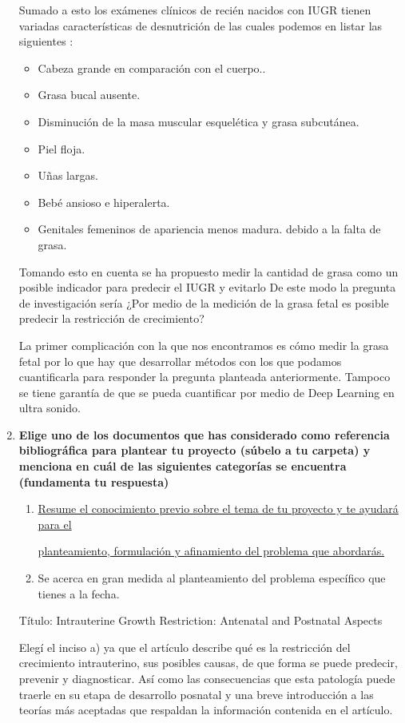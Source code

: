 \begin{enumerate}
	Sumado a esto los exámenes clínicos de recién nacidos con
	IUGR tienen variadas características de desnutrición de las
	cuales podemos en listar las siguientes
	\citep{sharma2016intrauterine}:
	\begin{itemize}
		\item Cabeza grande en comparación con el cuerpo..
		\item Grasa bucal ausente.
		\item Disminución de la masa muscular esquelética y grasa
		subcutánea.
		\item Piel floja.
		\item Uñas largas.
		\item Bebé ansioso e hiperalerta.
		\item Genitales femeninos de apariencia menos madura.
		debido a la falta de grasa.
	\end{itemize}
	
	Tomando esto en cuenta se ha propuesto medir la cantidad de
	grasa como un posible indicador para predecir el IUGR y 
	evitarlo De este modo la pregunta de investigación sería 
	¿Por medio de la medición	de la grasa fetal es posible
	predecir la	restricción de crecimiento?
	
	La primer complicación con la que nos encontramos es cómo
	medir la grasa fetal por lo que hay que desarrollar métodos
	con los que podamos cuantificarla para responder la pregunta
	planteada anteriormente. Tampoco se tiene garantía de que 
	se pueda cuantificar por medio de Deep Learning en ultra 
	sonido.
	
	\item \textbf{Elige uno de los documentos que has considerado como referencia bibliográfica para plantear tu
proyecto (súbelo a tu carpeta) y menciona en cuál de las siguientes categorías se encuentra (fundamenta
tu respuesta)}
	\begin{enumerate}
		\item \underline{Resume el conocimiento previo sobre el tema de tu proyecto y te ayudará para el} 
		
		\underline{planteamiento,
formulación y afinamiento del problema que abordarás.}
		\item Se acerca en gran medida al planteamiento del problema específico que tienes a la fecha.
	\end{enumerate}
	
	Título: Intrauterine Growth Restriction: Antenatal and Postnatal
Aspects

	Elegí el inciso a) ya que el artículo describe qué es la 
	restricción del crecimiento intrauterino, sus posibles causas,
	de que forma se puede predecir, prevenir y diagnosticar. Así
	como las consecuencias que esta patología puede traerle en 
	su etapa de desarrollo posnatal y una breve introducción a las
	teorías más aceptadas que respaldan la información contenida
	en el artículo.
	

\end{enumerate}

